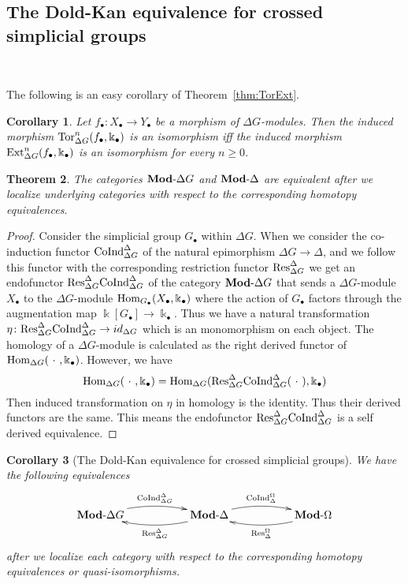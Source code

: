 \documentclass[a4paper,11pt]{amsart}
\newtheorem{theorem}{Theorem}[section]
\newtheorem{corollary}[theorem]{Corollary}
\theoremstyle{definition}
\newcommand{\rmod}[1]{\text{{\bf Mod}-}{#1}}
\newcommand{\Tor}{\text{\rm Tor}}
\newcommand{\Res}{\text{\rm Res}}
\newcommand{\Ext}{\text{\rm Ext}}
\newcommand{\Hom}{\text{\rm Hom}}
\newcommand{\CoInd}{\text{\rm CoInd}}
\newcommand{\Simp}{{\Delta}}
\newcommand{\Diff}{{\Omega}}
\begin{document}
\subsection{The Dold-Kan equivalence for crossed simplicial groups}~

The following is an easy corollary of  Theorem~\ref{thm:TorExt}.
\begin{corollary}\label{cor:EquivariantHomotopyEquivalence}
   Let $f_\bullet\colon X_\bullet\to Y_\bullet$ be a morphism of $\Simp G$-modules. Then the induced morphism $\Tor_{\Simp G}^n(f_\bullet,\Bbbk_\bullet)$ is an isomorphism iff the induced morphism $\Ext_{\Simp G}^n(f_\bullet,\Bbbk_\bullet)$ is an isomorphism for every $n\geq 0$.
\end{corollary}

\begin{theorem}\label{thm:equivalence}
   The categories $\rmod{\Simp G}$ and  $\rmod{\Simp}$ are equivalent after we localize underlying categories with respect to the corresponding homotopy equivalences.
\end{theorem}

\begin{proof}
  Consider the simplicial group $G_\bullet$ within $\Simp G$. When we consider the co-induction functor $\CoInd_{\Simp G}^{\Simp}$ of the natural epimorphism $\Simp G \to \Simp$, and we follow this functor with the corresponding restriction functor $\Res^{\Simp}_{\Simp G}$ we get an endofunctor $\Res^{\Simp}_{\Simp G}\CoInd^{\Simp}_{\Simp G}$ of the category $\rmod{\Simp G}$ that sends a $\Simp G$-module $X_\bullet$ to the $\Simp G$-module $\Hom_{G_\bullet}(X_\bullet,\Bbbk_\bullet)$ where the action of $G_\bullet$ factors through the augmentation map $\Bbbk[G_\bullet]\to \Bbbk_\bullet$. Thus we have a natural transformation $\eta\colon \Res^{\Simp}_{\Simp G}\CoInd^{\Simp}_{\Simp G}\to id_{\Simp G}$ which is an monomorphism on each object. The homology of a $\Simp G$-module is calculated as the right derived functor of $\Hom_{\Simp G}(\ \cdot\ ,\Bbbk_\bullet)$. However, we have
  \[\Hom_{\Simp G}(\ \cdot\ ,\Bbbk_\bullet) = \Hom_{\Simp G}(\Res^{\Simp}_{\Simp G}\CoInd^{\Simp}_{\Simp G}(\ \cdot\ ),\Bbbk_\bullet) \]
  Then induced transformation on $\eta$ in homology is the identity. Thus their derived functors are the same. This means the endofunctor $\Res^{\Simp}_{\Simp G}\CoInd^{\Simp}_{\Simp G}$ is a self derived equivalence.
\end{proof}

\begin{corollary}[The Dold-Kan equivalence for crossed simplicial groups]\label{cor:main-result}
We have the following equivalences
\[ \xymatrix{
\rmod{\Simp G} \ar@/^2ex/[rr]^{\CoInd_{\Simp G}^{\Simp}} 
&& \ar@/^2ex/[ll]^{\Res_{\Simp G}^{\Simp}} \rmod{\Simp} \ar@/^2ex/[rr]^{\CoInd^{\Diff}_{\Simp}} 
&& \ar@/^2ex/[ll]^{\Res_{\Simp}^{\Diff}} \rmod{\Diff}
}\]
after we localize each category with respect to the corresponding homotopy equivalences or quasi-isomorphisms.
\end{corollary}
\end{document}
